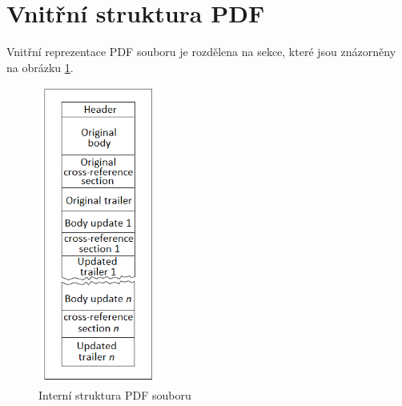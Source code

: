 	\section{Vnitřní struktura PDF}
Vnitřní reprezentace PDF souboru je rozdělena na sekce, které jsou znázorněny na obrázku \ref{fig:pdf_internal_structure}.

\begin{figure}[h!]
\centering
\includegraphics[width=4cm]{img/pdf_internal_structure}
\caption{Interní struktura PDF souboru}
\label{fig:pdf_internal_structure}
\end{figure}

